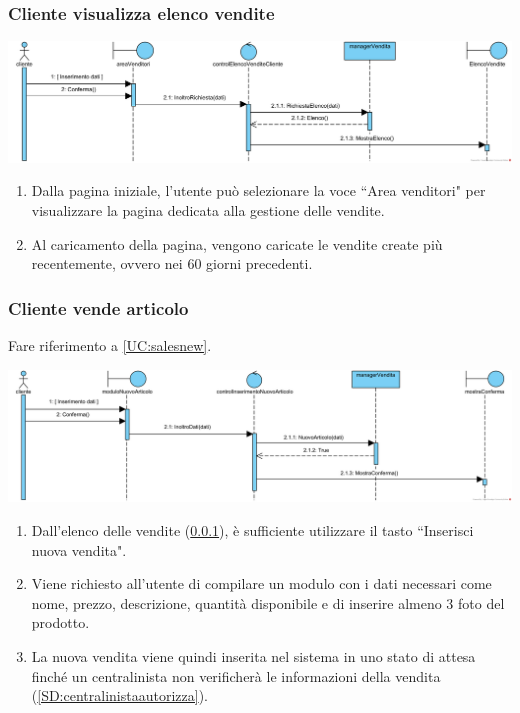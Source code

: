 \documentclass[12pt,a4paper]{article}
\begin{document}
\newpage

\subsubsection{Cliente visualizza elenco vendite}
\label{SD:elencovendite}

\begin{center}
\includegraphics[width=\textwidth]{SequenceDiagram/ClienteVenditaRicerca}
\end{center}

\begin{enumerate}
\item Dalla pagina iniziale, l'utente può selezionare la voce ``Area venditori" per visualizzare la pagina dedicata alla gestione delle vendite.
\item Al caricamento della pagina, vengono caricate le vendite create più recentemente, ovvero nei 60 giorni precedenti.
\end{enumerate}

\subsubsection{Cliente vende articolo}
\label{SD:creazionevendita}

Fare riferimento a \ref{UC:salesnew}. \\

\begin{center}
\includegraphics[width=\textwidth]{SequenceDiagram/ClienteVenditaCrea}
\end{center}

\begin{enumerate}
\item Dall'elenco delle vendite (\ref{SD:elencovendite}), è sufficiente utilizzare il tasto ``Inserisci nuova vendita".
\item Viene richiesto all'utente di compilare un modulo con i dati necessari come nome, prezzo, descrizione, quantità disponibile e di inserire almeno 3 foto del prodotto.
\item La nuova vendita viene quindi inserita nel sistema in uno stato di attesa finché un centralinista non verificherà le informazioni della vendita (\ref{SD:centralinistaautorizza}).
\end{enumerate}
\end{document}
